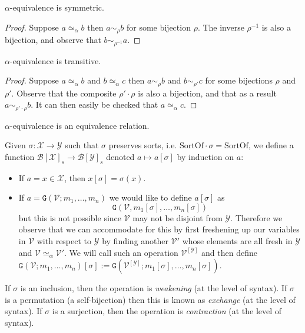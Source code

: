\begin{lemma}[Symmetry]
    $\alpha$-equivalence is symmetric.
\end{lemma}

\begin{proof}
    Suppose $a \simeq_\alpha b$ then $a \sim_\rho b$ for some bijection $\rho$. The inverse $\rho^{-1}$ is also a bijection, and observe that $b \sim_{\rho^{-1}} a$.
\end{proof}

\begin{lemma}
    $\alpha$-equivalence is transitive.
\end{lemma}

\begin{proof}
    Suppose $a \simeq_\alpha b$ and $b \simeq_\alpha c$ then $a \sim_\rho b$ and $b \sim_{\rho'} c$ for some bijections $\rho$ and $\rho'$. Observe that the composite $\rho' \cdot \rho$ is also a bijection, and that as a result $a \sim_{\rho' \cdot \rho} b$. It can then easily be checked that $a \simeq_\alpha c$.
\end{proof}

\begin{cor}
    $\alpha$-equivalence is an equivalence relation.
\end{cor}

\begin{defin}\label{sub}
    Given $\sigma : \mathcal{X} \to \mathcal{Y}$ such that $\sigma$ preserves sorts, i.e. $\mathrm{SortOf} \cdot \sigma = \mathrm{SortOf}$, we define a function $\mathcal{B}[\mathcal{X}]_s \to \mathcal{B}[\mathcal{Y}]_s$ denoted $a \mapsto a[\sigma]$ by induction on $a$:
    \begin{itemize}
        \item If $a = x \in \mathcal{X}$, then $x[\sigma] = \sigma(x)$.
        \item If $a = \mathtt{G}(\mathcal{V}; m_1, \dots , m_n)$ we would like to define $a[\sigma]$ as $$\mathtt{G}(\mathcal{V}, m_1[\sigma], \dots, m_n[\sigma])$$ but this is not possible since $\mathcal{V}$ may not be disjoint from $\mathcal{Y}$. Therefore we observe that we can accommodate for this by first freshening up our variables in $\mathcal{V}$ with respect to $\mathcal{Y}$ by finding another $\mathcal{V}'$ whose elements are all fresh in $\mathcal{Y}$ and $\mathcal{V} \simeq_{\alpha}\mathcal{V}'$. We will call such an operation $\mathcal{V}^{[\mathcal{Y}]}$ and then define $\mathtt{G}(\mathcal{V}; m_1 , \dots, m_n)[\sigma] := \mathtt{G}(\mathcal{V}^{[\mathcal{Y}]}; m_1[\sigma], \dots, m_n[\sigma])$. 
    \end{itemize}
    
    If $\sigma$ is an inclusion, then the operation is \emph{weakening} (at the level of syntax).
    If $\sigma$ is a permutation (a self-bijection) then this is known as \emph{exchange} (at the level of syntax).
    If $\sigma$ is a surjection, then the operation is \emph{contraction} (at the level of syntax).
\end{defin}

